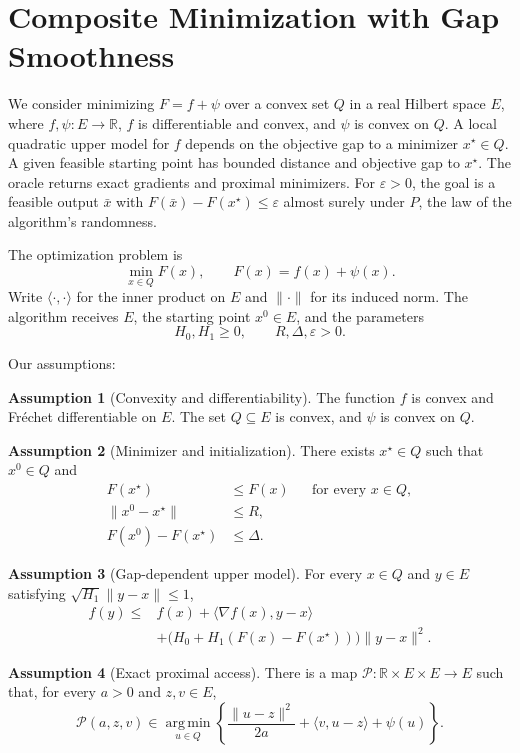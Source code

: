 \documentclass[10pt]{article}
\theoremstyle{definition}
\newtheorem{assumption}{Assumption}
\begin{document}
\section*{Composite Minimization with Gap Smoothness}
We consider minimizing $F=f+\psi$ over a convex set $Q$ in a real Hilbert space $E$, where $f,\psi:E\to\mathbb{R}$, $f$ is differentiable and convex, and $\psi$ is convex on $Q$. A local quadratic upper model for $f$ depends on the objective gap to a minimizer $x^\star\in Q$. A given feasible starting point has bounded distance and objective gap to $x^\star$. The oracle returns exact gradients and proximal minimizers. For $\varepsilon>0$, the goal is a feasible output $\bar{x}$ with $F(\bar{x})-F(x^\star)\leq\varepsilon$ almost surely under $P$, the law of the algorithm's randomness.

The optimization problem is
\[
\min_{x\in Q} F(x),
\qquad F(x)=f(x)+\psi(x).
\]
Write $\langle\cdot,\cdot\rangle$ for the inner product on $E$ and $\|\cdot\|$ for its induced norm. The algorithm receives $E$, the starting point $x^0\in E$, and the parameters
\[
H_0,H_1\geq 0,
\qquad R,\Delta,\varepsilon>0.
\]

Our assumptions:
\begin{assumption}[Convexity and differentiability]
The function $f$ is convex and Fr\'echet differentiable on $E$. The set $Q\subseteq E$ is convex, and $\psi$ is convex on $Q$.
\end{assumption}

\begin{assumption}[Minimizer and initialization]
There exists $x^\star\in Q$ such that $x^0\in Q$ and
\[
\begin{aligned}
F(x^\star)&\leq F(x) &&\text{for every }x\in Q,\\
\|x^0-x^\star\|&\leq R,\\
F(x^0)-F(x^\star)&\leq\Delta.
\end{aligned}
\]
\end{assumption}

\begin{assumption}[Gap-dependent upper model]
For every $x\in Q$ and $y\in E$ satisfying $\sqrt{H_1}\|y-x\|\leq 1$,
\[
\begin{aligned}
f(y)\leq {}&f(x)+\langle\nabla f(x),y-x\rangle\\
&+\bigl(H_0+H_1(F(x)-F(x^\star))\bigr)\|y-x\|^2.
\end{aligned}
\]
\end{assumption}

\begin{assumption}[Exact proximal access]
There is a map $\mathcal{P}:\mathbb{R}\times E\times E\to E$ such that, for every $a>0$ and $z,v\in E$,
\[
\mathcal{P}(a,z,v)\in
\operatorname*{arg\,min}_{u\in Q}
\left\{\frac{\|u-z\|^2}{2a}
+\langle v,u-z\rangle+\psi(u)\right\}.
\]
\end{assumption}
\end{document}
